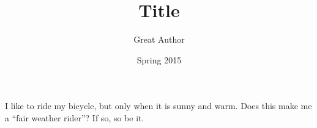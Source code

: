\documentclass[11pt]{article}
\title{Title}
\author{Great Author}
\date{Spring 2015}
\begin{document}
\maketitle
 
I like to ride my bicycle, but only when it is sunny and warm. Does this make me a ``fair weather rider''? If so, so be it.
 
\end{document}
